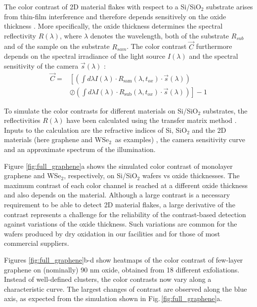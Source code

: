\documentclass[reprint, prl, superscriptaddress, floatfix]{revtex4-2}
\newcommand{\fig}[1]{Fig.\,\ref{#1}}
\newcommand{\WSe}{WSe$_2$}
\begin{document}
The color contrast of 2D material flakes with respect to a Si/SiO$_2$ substrate arises from thin-film interference and therefore depends sensitively on the oxide thickness \cite{Gao2008, Li2019Sep}.
More specifically, the oxide thickness determines the spectral reflectivity $R(\lambda)$, where $\lambda$ denotes the wavelength, both of the substrate $R_{sub}$ and of the sample on the substrate $R_{sam}$. 
The color contrast  $\vec{C}$ furthermore depends on the spectral irradiance of the light source $I(\lambda)$ and the spectral sensitivity of the camera  $\vec{s}(\lambda)$ \cite{Muller2015}:
\begin{equation}
\begin{aligned}
    \vec{C} = & \left[ \left( \int d\lambda I(\lambda) \cdot R_{\mathrm{sam}}(\lambda, t_{ox}) \cdot \vec{s}(\lambda) \right) \right. \\
    & \left. \oslash  \left( \int d\lambda I(\lambda) \cdot R_{\mathrm{sub}}(\lambda, t_{ox}) \cdot \vec{s}(\lambda)  \right ) \right ]  - 1
\end{aligned}
\end{equation}

To simulate the color contrasts for different materials on Si/SiO$_2$ substrates, the reflectivities $R(\lambda)$ have been calculated using the transfer matrix method \cite{Alonso-Alvarez2018}.
Inputs to the calculation are the refractive indices of Si, SiO$_2$ and the 2D materials (here graphene and \WSe\ as examples) \cite{Weber2010, Green1995, Malitson1965, Li2018}, the camera sensitivity curve and an approximate spectrum of the illumination.

Figure \ref{fig:full_graphene}a shows the simulated color contrast of monolayer graphene and \WSe, respectively, on Si/SiO$_2$ wafers vs oxide thicknesses. 
The maximum contrast of each color channel is reached at a different oxide thickness and also depends on the material. 
Although a large contrast is a necessary requirement to be able to detect 2D material flakes, a large derivative of the contrast represents a challenge for the reliability of the contrast-based detection against variations of the oxide thickness. 
Such variations are common for the wafers produced  by dry oxidation in our facilities and for those of most commercial suppliers. 

Figures \ref{fig:full_graphene}b-d show heatmaps of the color contrast of few-layer graphene on (nominally) 90 nm oxide, obtained from 18 different exfoliations.
Instead of well-defined clusters, the color contrasts now vary along a characteristic curve.
The largest changes of contrast are observed along the blue axis, as expected from the simulation shown in \fig{fig:full_graphene}a. 
\end{document}
